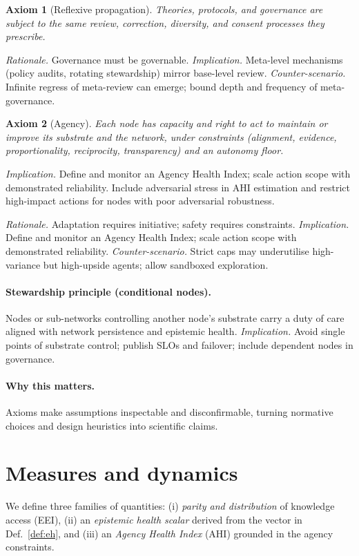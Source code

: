 \documentclass[12pt]{article}
\newtheorem{axiom}{Axiom}
\begin{document}
\begin{axiom}[Reflexive propagation]
Theories, protocols, and governance are subject to the same review, correction, diversity, and consent processes they prescribe.
\end{axiom}
\emph{Rationale.} Governance must be governable. 
\emph{Implication.} Meta-level mechanisms (policy audits, rotating stewardship) mirror base-level review.
\emph{Counter-scenario.} Infinite regress of meta-review can emerge; bound depth and frequency of meta-governance.

\begin{axiom}[Agency]
Each node has capacity and right to act to maintain or improve its substrate and the network, under constraints (alignment, evidence, proportionality, reciprocity, transparency) and an autonomy floor.
\end{axiom}
\emph{Implication.} Define and monitor an Agency Health Index; scale action scope with demonstrated reliability. Include adversarial stress in AHI estimation and restrict high-impact actions for nodes with poor adversarial robustness.

\emph{Rationale.} Adaptation requires initiative; safety requires constraints. 
\emph{Implication.} Define and monitor an Agency Health Index; scale action scope with demonstrated reliability.
\emph{Counter-scenario.} Strict caps may underutilise high-variance but high-upside agents; allow sandboxed exploration.

\paragraph{Stewardship principle (conditional nodes).}
Nodes or sub-networks controlling another node's substrate carry a duty of care aligned with network persistence and epistemic health. 
\emph{Implication.} Avoid single points of substrate control; publish SLOs and failover; include dependent nodes in governance.

\paragraph{Why this matters.} Axioms make assumptions inspectable and disconfirmable, turning normative choices and design heuristics into scientific claims.
\section{Measures and dynamics}
We define three families of quantities: (i) \emph{parity and distribution} of knowledge access (EEI), (ii) an \emph{epistemic health scalar} derived from the vector in Def.~\ref{def:eh}, and (iii) an \emph{Agency Health Index} (AHI) grounded in the agency constraints.
\end{document}

